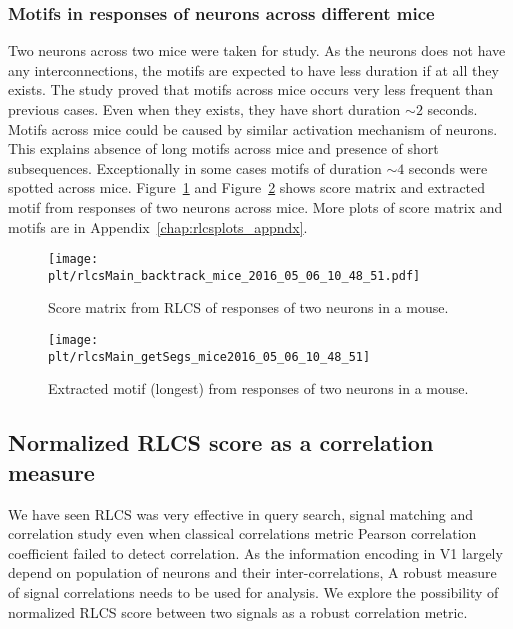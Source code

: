 \documentclass[MTech]{iitmdiss}
\newcommand{\plt}{thesis_plots}
\begin{document}
\subsubsection{Motifs in responses of neurons across different mice} %
\label{ssub:motifs_in_responses_of_neurons_across_different_mice}
Two neurons across two mice were taken for study. As the neurons does not have any interconnections, the motifs are expected to have less duration if at all they exists. The study proved that motifs across mice occurs very less frequent than previous cases. Even when they exists, they have short duration $\sim 2$ seconds. Motifs across mice could be caused by similar activation mechanism of neurons. This explains absence of long motifs across mice and presence of short subsequences. Exceptionally in some cases motifs of duration $\sim 4$ seconds were spotted across mice. Figure~\ref{img:score_mice} and Figure~\ref{img:motif_mice} shows score matrix and extracted motif from responses of two neurons across mice. More plots of score matrix and motifs are in Appendix~\ref{chap:rlcsplots_appndx}.
\begin{figure}
    \centering
    \texttt{[image: \\plt/rlcsMain\_backtrack\_mice\_2016\_05\_06\_10\_48\_51.pdf]}
    \caption{Score matrix from RLCS of responses of two neurons in a mouse.}
    \label{img:score_mice}
\end{figure}
\begin{figure}
    \centering
    \texttt{[image: \\plt/rlcsMain\_getSegs\_mice2016\_05\_06\_10\_48\_51]}
    \caption{Extracted motif (longest) from responses of two neurons in a mouse.}
    \label{img:motif_mice}
\end{figure}
\subsection{Normalized RLCS score as a correlation measure} %
\label{sub:normalized_rlcs_score_as_a_correlation_metric}
We have seen RLCS was very effective in query search, signal matching and correlation study even when classical correlations metric Pearson correlation coefficient failed to detect correlation. As the information encoding in V1 largely depend on population of neurons and their inter-correlations, A robust measure of signal correlations needs to be used for analysis. We explore the possibility of normalized RLCS score between two signals as a robust correlation metric.
\end{document}
